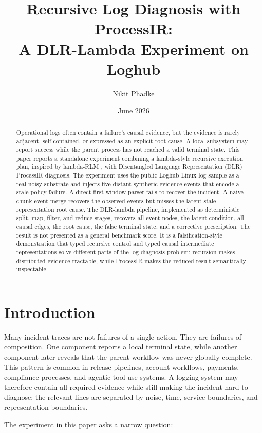 \documentclass[11pt]{article}
\title{\textbf{Recursive Log Diagnosis with ProcessIR:}\\
A DLR-Lambda Experiment on Loghub}
\author{Nikit Phadke}
\date{June 2026}
\begin{document}
\maketitle

\begin{abstract}
Operational logs often contain a failure's causal evidence, but the evidence is
rarely adjacent, self-contained, or expressed as an explicit root cause. A local
subsystem may report success while the parent process has not reached a valid
terminal state. This paper reports a standalone experiment combining a
lambda-style recursive execution plan, inspired by lambda-RLM \cite{lambda_rlm},
with Disentangled Language Representation (DLR) ProcessIR diagnosis. The
experiment uses the public Loghub Linux log
sample as a real noisy substrate and injects five distant synthetic evidence
events that encode a stale-policy failure. A direct first-window parser fails to
recover the incident. A naive chunk event merge recovers the observed events but
misses the latent stale-representation root cause. The DLR-lambda pipeline,
implemented as deterministic split, map, filter, and reduce stages, recovers all
event nodes, the latent condition, all causal edges, the root cause, the false
terminal state, and a corrective prescription. The result is not presented as a
general benchmark score. It is a falsification-style demonstration that typed
recursive control and typed causal intermediate representations solve different
parts of the log diagnosis problem: recursion makes distributed evidence
tractable, while ProcessIR makes the reduced result semantically inspectable.
\end{abstract}

\section{Introduction}

Many incident traces are not failures of a single action. They are failures of
composition. One component reports a local terminal state, while another
component later reveals that the parent workflow was never globally complete.
This pattern is common in release pipelines, account workflows, payments,
compliance processes, and agentic tool-use systems. A logging system may
therefore contain all required evidence while still making the incident hard to
diagnose: the relevant lines are separated by noise, time, service boundaries,
and representation boundaries.

The experiment in this paper asks a narrow question:
\end{document}
